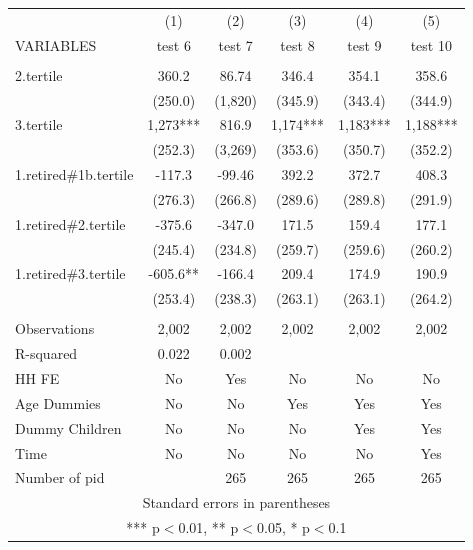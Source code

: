 \begin{tabular}{lccccc} \hline
 & (1) & (2) & (3) & (4) & (5) \\
VARIABLES & test 6 & test 7 & test 8 & test 9 & test 10 \\ \hline
 &  &  &  &  &  \\
2.tertile & 360.2 & 86.74 & 346.4 & 354.1 & 358.6 \\
 & (250.0) & (1,820) & (345.9) & (343.4) & (344.9) \\
3.tertile & 1,273*** & 816.9 & 1,174*** & 1,183*** & 1,188*** \\
 & (252.3) & (3,269) & (353.6) & (350.7) & (352.2) \\
1.retired\#1b.tertile & -117.3 & -99.46 & 392.2 & 372.7 & 408.3 \\
 & (276.3) & (266.8) & (289.6) & (289.8) & (291.9) \\
1.retired\#2.tertile & -375.6 & -347.0 & 171.5 & 159.4 & 177.1 \\
 & (245.4) & (234.8) & (259.7) & (259.6) & (260.2) \\
1.retired\#3.tertile & -605.6** & -166.4 & 209.4 & 174.9 & 190.9 \\
 & (253.4) & (238.3) & (263.1) & (263.1) & (264.2) \\
 &  &  &  &  &  \\
Observations & 2,002 & 2,002 & 2,002 & 2,002 & 2,002 \\
R-squared & 0.022 & 0.002 &  &  &  \\
HH FE & No & Yes & No & No & No \\
Age Dummies & No & No & Yes & Yes & Yes \\
Dummy Children & No & No & No & Yes & Yes \\
Time & No & No & No & No & Yes \\
 Number of pid &  & 265 & 265 & 265 & 265 \\ \hline
\multicolumn{6}{c}{ Standard errors in parentheses} \\
\multicolumn{6}{c}{ *** p$<$0.01, ** p$<$0.05, * p$<$0.1} \\
\end{tabular}

